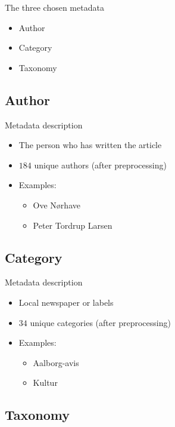 \begin{frame}{\insertsection}{The three chosen metadata}
	\begin{itemize}
		\item Author
		\item Category
		\item Taxonomy
	\end{itemize}
\end{frame}

\subsection{Author}

\begin{frame}{\insertsubsection}{Metadata description}
	\begin{itemize}
		\item The person who has written the article
		\item $184$ unique authors (after preprocessing)
		\item Examples: 
		\begin{itemize}
			\item Ove Nørhave
			\item Peter Tordrup Larsen
		\end{itemize}
	\end{itemize}
\end{frame}


\subsection{Category}

\begin{frame}{\insertsubsection}{Metadata description}
	\begin{itemize}
		\item Local newspaper or labels
		\item $34$ unique categories (after preprocessing)
		\item Examples:
		\begin{itemize}
			\item Aalborg-avis
			\item Kultur
		\end{itemize}
	\end{itemize}
\end{frame}


\subsection{Taxonomy}

